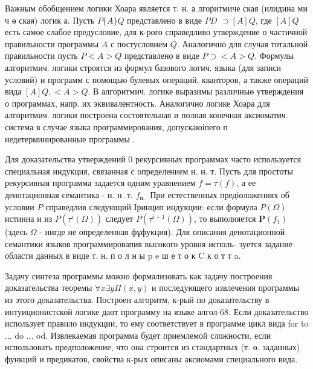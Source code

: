 \documentclass[10pt]{article}
\begin{document}
Важным обобщением логики Хоара является т. н. а лгоритмиче ская (илидина ми ч ө ская) логик а. Пусть $P\{A\} Q$ представлено в виде $P D$ $\supset[A] Q$, где $[A] Q$ есть самое слабое предусловие, для к-рого справедливо утверждение о частичной правильности программы $A$ с постусловием $Q$. Аналогично для случая тотальной правильности пусть $P<A>Q$ представлено в виде $P \supset<A>Q$. Формулы алгоритмич. логики строятся из формул базового логич. языка (для записи условий) и программ с помощью булевых операций, кванторов, а также операций вида $[A] Q,<A>Q$. В алгоритмич. логике выразимы различныө утверждения о программах, напр. их эквивалентность. Аналогично логике Хоара для алгоритмич. логики построена состоятельная и полная конечная аксиоматич. система в случае языка программирования, допускаюіпего п недетерминированные программы .



Для доказательства утверждений 0 рекурсивных программах часто используется специальная индукция, связанная с определением н. н. т. Пусть для простоты рекурсивная программа задается одним уравнением $f=\tau(f)$, а ее денотационная семантика - н. н. т. $f_{\text {н. }}$ При естественных предіоложениях об условии $P$ справедлив следующий Іринцип индукции: если формула $P(\Omega)$ истинна и из $P\left(\tau^{i}(\Omega)\right)$ следует $P\left(\tau^{i+1}(\Omega)\right)$, то выполняется $\boldsymbol{P}\left(f_{1}\right)$ (здесь $\Omega$ - нигде не определенная фұфукция). Для описания денотационной семантики языков программировапия высокого уровня исполь- зуется задание области данных в виде т. н. п о л н ы p e ш е т о к C к о т т a.



Задачу синтеза программы можно формализовать как задачу построения доказательства теоремы $\forall x \exists y \Pi(x, y)$ и последующего извлечения программы из этого доказательства. Построен алгоритм, к-рый по доказательству в интуиционистской логике даөт программу на языке алгол-68. Если доказательство использует правило индукции, то ему соответствует в программе цикл вида for to ... do ... od. Извлекаемая программа будет приемлемой сложности, если использовать предположение, что она строится из стандартных (т. ө. заданных) функций и предикатов, свойства к-рых описаны аксиомами специального вида.
\end{document}
